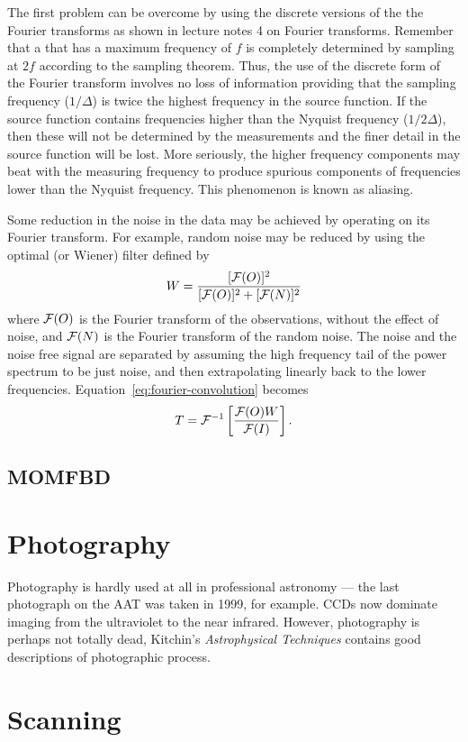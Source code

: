 The first problem can be overcome by using the discrete versions of the the Fourier transforms as shown in lecture notes 4 on Fourier transforms. Remember that a that has 
a maximum frequency of $f$ is completely determined by sampling at $2f$ according to the sampling theorem. Thus, the use of the discrete form of the Fourier transform involves no loss of information providing that the sampling frequency (${1/\Delta}$) is twice the highest frequency in the source function. If the source function contains frequencies higher than the Nyquist frequency (${1/2\Delta}$), then these will not be determined by the measurements and the finer detail in the source function will be lost. More seriously, the higher frequency components may beat with the measuring frequency to produce spurious components of frequencies lower than the Nyquist frequency. This phenomenon is known as aliasing. 

Some reduction in the noise in the data may be achieved by operating on its Fourier transform. For example, random noise may be reduced by using the optimal (or Wiener) filter defined by 
\[
W={[{\cal F}(O)]^2\over[{\cal F}(O)]^2+[{\cal F}(N)]^2}
\]
where ${\cal F}(O)$ is the Fourier transform of the observations, without the effect of noise, and ${\cal F}(N)$ is the Fourier transform of the random noise. The noise and the noise free signal are separated by assuming the high frequency tail of the power spectrum to be just noise, and then extrapolating linearly back to the lower frequencies. Equation~\ref{eq:fourier-convolution} becomes
\[
T={\cal F}^{-1}\left[{{\cal F}(O)W\over{\cal F}(I)}\right].
\]
\subsection{MOMFBD}

\section{Photography}
Photography is hardly used at all in professional astronomy --- the last photograph on the AAT was taken in 1999, for example. CCDs now dominate imaging from the ultraviolet to the near infrared. However, photography is perhaps not totally dead, Kitchin's {\it Astrophysical Techniques} contains good descriptions of photographic process.

\section{Scanning}

